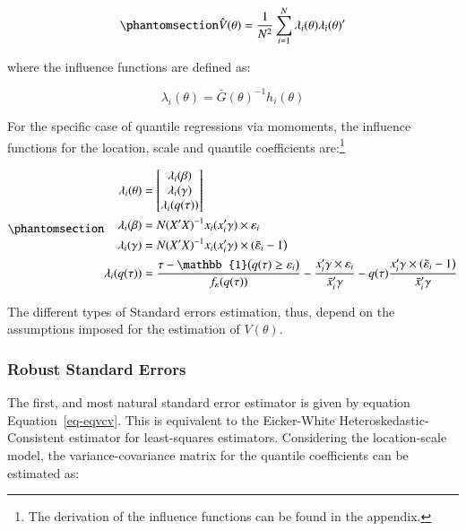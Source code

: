 \documentclass[
  authoryear,
  review,
  1p]{elsarticle}
\begin{document}
\begin{equation}\phantomsection\label{eq-eqvcv}{\hat{V}(\theta) = \frac{1}{N^2} \sum_{i=1}^N \lambda_i(\theta) \lambda_i(\theta)'
}\end{equation}

where the influence functions are defined as:

\[\lambda_i(\theta) = \bar G(\theta)^{-1} h_i(\theta)\]

For the specific case of quantile regressions via momoments, the
influence functions for the location, scale and quantile coefficients
are:\footnote{The derivation of the influence functions can be found in
  the appendix.}

\begin{equation}\phantomsection\label{eq-ifs}{\begin{aligned}
\lambda_i(\theta)&=
  \begin{bmatrix}
  \lambda_{i}(\beta) \\
  \lambda_{i}(\gamma) \\
  \lambda_{i}(q(\tau)) 
  \end{bmatrix} \\
\lambda_{i}(\beta)&=N (X'X)^{-1}  x_i ( x_i'\gamma) \times \varepsilon_i \\
\lambda_{i}(\gamma)&= N(X'X)^{-1} x_i ( x_i' \gamma ) \times (\tilde \varepsilon_i -1\big)\\
\lambda_{i}(q(\tau))&=\frac{\tau-\mathbb{1}\big( q(\tau)  \geq \varepsilon_i  \big) }{f_{\varepsilon}(q(\tau))}
- \frac{ x_i'\gamma \times \varepsilon_i }{\bar x_i'\gamma} 
-  q(\tau) \frac{  x_i' \gamma  \times (\tilde \varepsilon_i -1\big)}{\bar x_i'\gamma}
\end{aligned}
}\end{equation}

The different types of Standard errors estimation, thus, depend on the
assumptions imposed for the estimation of \(V(\theta)\).

\subsubsection{Robust Standard Errors}\label{robust-standard-errors}

The first, and most natural standard error estimator is given by
equation Equation~\ref{eq-eqvcv}. This is equivalent to the Eicker-White
Heteroskedastic-Consistent estimator for least-squares estimators.
Considering the location-scale model, the variance-covariance matrix for
the quantile coefficients can be estimated as:
\end{document}
